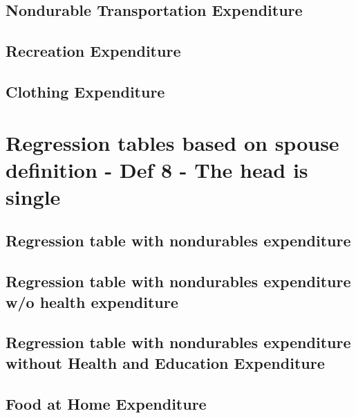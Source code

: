 \documentclass[a4paper,landscape]{article}
\begin{document}
\subsection{Nondurable Transportation Expenditure}

\clearpage

\subsection{Recreation Expenditure}

\clearpage

\subsection{Clothing Expenditure}

\clearpage



\section{Regression tables based on spouse definition - Def 8 - The head is single}

\subsection{Regression table with nondurables expenditure}

\clearpage

\subsection{Regression table with nondurables expenditure w/o health expenditure} 

\clearpage

\subsection{Regression table with nondurables expenditure without Health and Education Expenditure}

\clearpage


\subsection{Food at Home Expenditure}

\clearpage
\end{document}

